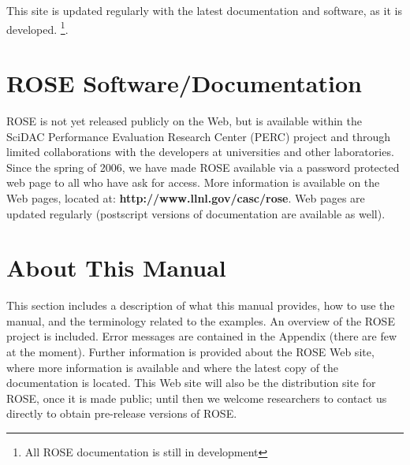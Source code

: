This site is updated regularly with the latest documentation and software, as it is 
developed.
\footnote{All ROSE documentation is still in development}.


\section{ROSE Software/Documentation}
     ROSE is not yet released publicly on the Web, but is available
within the SciDAC Performance Evaluation Research Center (PERC) 
project and through limited collaborations with the developers
at universities and other laboratories.  Since the spring of 2006, we have made ROSE 
available via a password protected web page to all who have ask for access.
More information is available on the
Web pages, located at:
{\bf http://www.llnl.gov/casc/rose}.
Web pages are updated regularly (postscript versions of 
documentation are available as well).

\section{About This Manual}

   This section includes a description of what this manual
provides, how to use the manual, and the terminology related to
the examples.  
An overview of the ROSE project is included. Error messages 
are contained in the Appendix (there are few at the moment).  
Further information is provided about
the ROSE Web site, where more information is available and where
the latest copy of the documentation is located.  This Web site will also be the
distribution site for ROSE, once it is made public; until then we welcome 
researchers to contact us directly to obtain pre-release versions of ROSE.


